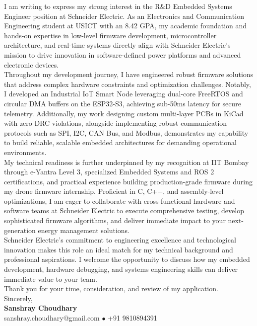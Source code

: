 \documentclass[10pt,a4paper]{article}%
\begin{document}
\noindent I am writing to express my strong interest in the R\&D Embedded Systems Engineer position at Schneider Electric. As an Electronics and Communication Engineering student at USICT with an 8.42 GPA, my academic foundation and hands-on expertise in low-level firmware development, microcontroller architecture, and real-time systems directly align with Schneider Electric's mission to drive innovation in software-defined power platforms and advanced electronic devices.
\vspace{8pt}\\
Throughout my development journey, I have engineered robust firmware solutions that address complex hardware constraints and optimization challenges. Notably, I developed an Industrial IoT Smart Node leveraging dual-core FreeRTOS and circular DMA buffers on the ESP32-S3, achieving sub-50ms latency for secure telemetry. Additionally, my work designing custom multi-layer PCBs in KiCad with zero DRC violations, alongside implementing robust communication protocols such as SPI, I2C, CAN Bus, and Modbus, demonstrates my capability to build reliable, scalable embedded architectures for demanding operational environments.
\vspace{8pt}\\
My technical readiness is further underpinned by my recognition at IIT Bombay through e-Yantra Level 3, specialized Embedded Systems and ROS 2 certifications, and practical experience building production-grade firmware during my drone firmware internship. Proficient in C, C++, and assembly-level optimizations, I am eager to collaborate with cross-functional hardware and software teams at Schneider Electric to execute comprehensive testing, develop sophisticated firmware algorithms, and deliver immediate impact to your next-generation energy management solutions. \vspace{8pt}\\

\noindent Schneider Electric's commitment to engineering excellence and technological innovation makes this role an ideal match for my technical background and professional aspirations. I welcome the opportunity to discuss how my embedded development, hardware debugging, and systems engineering skills can deliver immediate value to your team. \vspace{8pt}\\%

\noindent Thank you for your time, consideration, and review of my application. \vspace{18pt}\\%

\noindent Sincerely, \vspace{8pt}\\%
\textbf{Sanshray Choudhary} \\%
sanshray.choudhary@gmail.com $\bullet$ +91 9810894391 \\%
\end{document}
